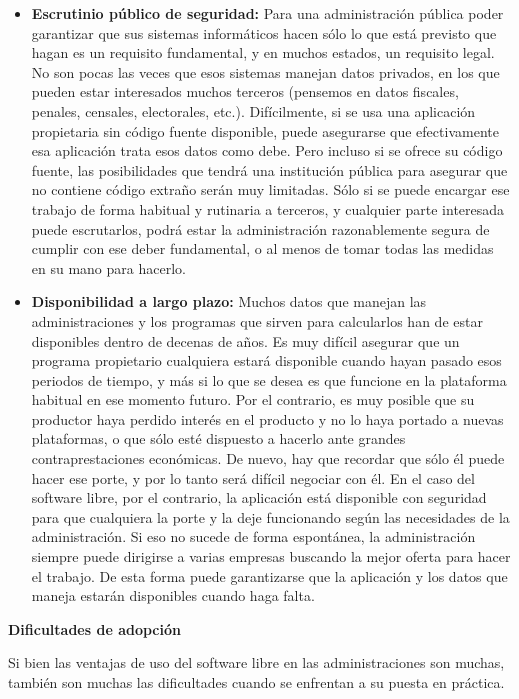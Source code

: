 \begin{itemize}
\item \textbf{Escrutinio público de seguridad:} Para una administración pública poder garantizar que sus sistemas informáticos hacen sólo lo que está previsto que hagan es un requisito fundamental, y en muchos estados, un requisito legal. No son pocas las veces que esos sistemas manejan datos privados, en los que pueden estar interesados muchos terceros (pensemos en datos fiscales, penales, censales, electorales, etc.). Difícilmente, si se usa una aplicación propietaria sin código fuente disponible, puede asegurarse que efectivamente esa aplicación trata esos datos como debe. Pero incluso si se ofrece su código fuente, las posibilidades que tendrá una institución pública para asegurar que no contiene código extraño serán muy limitadas. Sólo si se puede encargar ese trabajo de forma habitual y rutinaria a terceros, y cualquier parte interesada puede escrutarlos, podrá estar la administración razonablemente segura de cumplir con ese deber fundamental, o al menos de tomar todas las medidas en su mano para hacerlo.

\item \textbf{Disponibilidad a largo plazo:} Muchos datos que manejan las administraciones y los programas
que sirven para calcularlos han de estar disponibles dentro de decenas de años. Es muy difícil asegurar que un programa propietario cualquiera estará disponible cuando hayan pasado esos periodos de tiempo, y más si lo que se desea es que funcione en la plataforma habitual en ese momento futuro. Por el contrario, es muy posible que su productor haya perdido interés en el producto y no lo haya portado a nuevas plataformas, o que sólo esté dispuesto a hacerlo ante grandes contraprestaciones económicas. De nuevo, hay que recordar que sólo él puede hacer ese porte, y por lo tanto será difícil negociar con él. En el caso del software libre, por el contrario, la aplicación está disponible con seguridad para que cualquiera la porte y la deje funcionando según las necesidades de la administración. Si eso no sucede de forma espontánea, la administración siempre puede dirigirse a varias empresas buscando la mejor oferta para hacer el trabajo. De esta forma puede garantizarse que la aplicación y los datos que maneja
estarán disponibles cuando haga falta.
\end{itemize}

{\bf Dificultades de adopción}\newline

Si bien las ventajas de uso del software libre en las administraciones son muchas, también son muchas las dificultades cuando se enfrentan a su puesta en práctica.

